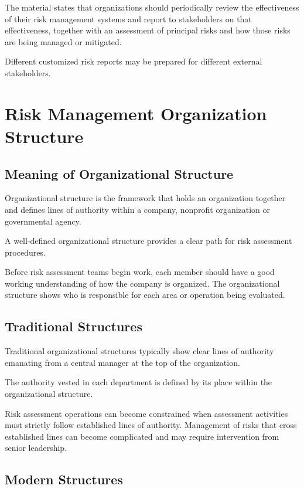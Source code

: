 \documentclass[
]{book}
\begin{document}
The material states that organizations should periodically review the effectiveness of their risk management systems and report to stakeholders on that effectiveness, together with an assessment of principal risks and how those risks are being managed or mitigated.

Different customized risk reports may be prepared for different external stakeholders.

\chapter{Risk Management Organization Structure}\label{risk-management-organization-structure}

\section{Meaning of Organizational Structure}\label{meaning-of-organizational-structure}

Organizational structure is the framework that holds an organization together and defines lines of authority within a company, nonprofit organization or governmental agency.

A well-defined organizational structure provides a clear path for risk assessment procedures.

Before risk assessment teams begin work, each member should have a good working understanding of how the company is organized. The organizational structure shows who is responsible for each area or operation being evaluated.

\section{Traditional Structures}\label{traditional-structures}

Traditional organizational structures typically show clear lines of authority emanating from a central manager at the top of the organization.

The authority vested in each department is defined by its place within the organizational structure.

Risk assessment operations can become constrained when assessment activities must strictly follow established lines of authority. Management of risks that cross established lines can become complicated and may require intervention from senior leadership.

\section{Modern Structures}\label{modern-structures}
\end{document}
